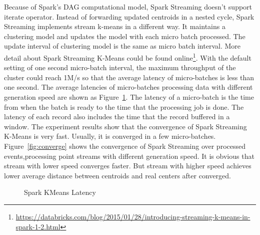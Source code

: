 Because of Spark's DAG computational model, Spark Streaming doesn't support iterate operator. Instead of forwarding updated centroids in a nested cycle, Spark Streaming implements stream k-means in a different way. It maintains a clustering model and updates the model with each micro batch processed. The update interval of clustering model is the same as micro batch interval. More detail about Spark Streaming K-Means could be found online\footnote{\url{https://databricks.com/blog/2015/01/28/introducing-streaming-k-means-in-spark-1-2.html}}. With the default setting of one second micro-batch interval, the maximum throughput of the cluster could reach 1M/s so that the average latency of micro-batches is less than one second. The average latencies of micro-batches processing data with different generation speed are shown as Figure~\ref{fig:spark_kmeans_latency}. The latency of a micro-batch is the time from when the batch is ready to the time that the processing job is done. The latency of each record also includes the time that the record buffered in a window.
The experiment results show that the convergence of Spark Streaming K-Means is very fast. Usually, it is converged in a few micro-batches. Figure~\ref{fig:converge}  shows the convergence of Spark Streaming over processed events,processing point streams with different generation speed. It is obvious that stream with lower speed converges faster. But stream with higher speed achieves lower average distance between centroids and real centers after converged.
 
\begin{figure}
  \begin{center}
   \caption{Spark KMeans Latency}
   \label{fig:spark_kmeans_latency}
  \end{center}
\end{figure}

